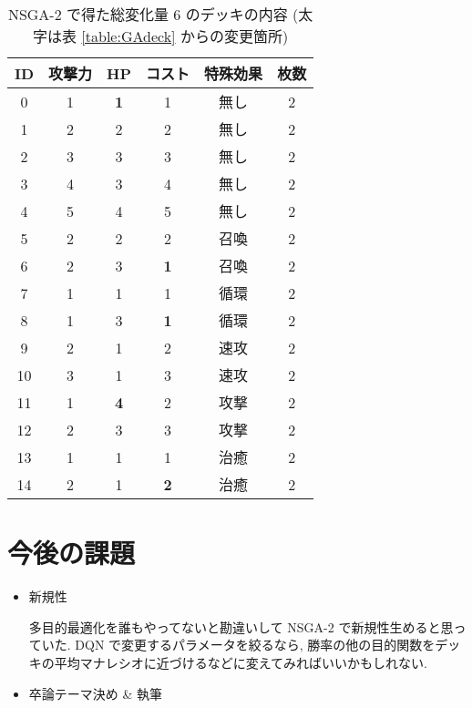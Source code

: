 \documentclass{jarticle}     %
\begin{document}
  \begin{table}[h]
    \centering
    \caption{ NSGA-2 で得た総変化量 6 のデッキの内容 (太字は表 \ref{table:GAdeck} からの変更箇所)}
    \label{table:NSGAresdeck}
    \begin{tabular}{|c|c|c|c|c|c|}
    \hline
    ID & 攻撃力 & HP & コスト & 特殊効果 & 枚数 \\ \hline
    0 & 1 & \textbf{1} & 1 & 無し & 2 \\ \hline
    1 & 2 & 2 & 2 & 無し & 2 \\ \hline
    2 & 3 & 3 & 3 & 無し & 2 \\ \hline
    3 & 4 & 3 & 4 & 無し & 2 \\ \hline
    4 & 5 & 4 & 5 & 無し & 2 \\ \hline
    5 & 2 & 2 & 2 & 召喚 & 2 \\ \hline
    6 & 2 & 3 & \textbf{1} & 召喚 & 2 \\ \hline
    7 & 1 & 1 & 1 & 循環 & 2 \\ \hline
    8 & 1 & 3 & \textbf{1} & 循環 & 2 \\ \hline
    9 & 2 & 1 & 2 & 速攻 & 2 \\ \hline
    10 & 3 & 1 & 3 & 速攻 & 2 \\ \hline
    11 & 1 & \textbf{4} & 2 & 攻撃 & 2 \\ \hline
    12 & 2 & 3 & 3 & 攻撃 & 2 \\ \hline
    13 & 1 & 1 & 1 & 治癒 & 2 \\ \hline
    14 & 2 & 1 & \textbf{2} & 治癒 & 2 \\ \hline
    \end{tabular}
    \end{table}

    


\section{今後の課題}
\begin{itemize}
  \item 新規性
  \par
  多目的最適化を誰もやってないと勘違いして NSGA-2 で新規性生めると思っていた. 
  DQN で変更するパラメータを絞るなら, 勝率の他の目的関数をデッキの平均マナレシオに近づけるなどに変えてみればいいかもしれない.
  \item 卒論テーマ決め \& 執筆
\end{itemize}




\end{document}
